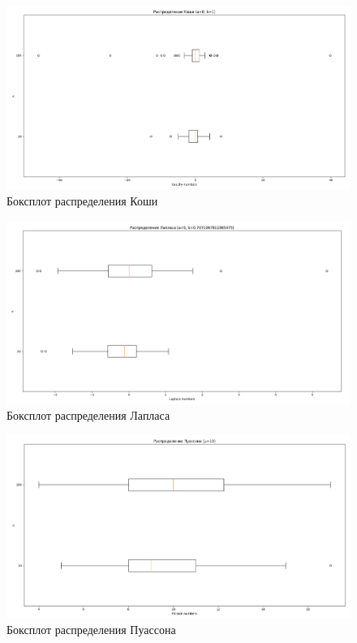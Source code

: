 \begin{figure}[H]
	\centering
	\includegraphics[scale=0.3]{resources/3_cauchy.png}
	\caption{Боксплот распределения Коши}
\end{figure}

\begin{figure}[H]
	\centering
	\includegraphics[scale=0.3]{resources/3_laplace.png}
	\caption{Боксплот распределения Лапласа}
\end{figure}

\begin{figure}[H]
	\centering
	\includegraphics[scale=0.3]{resources/3_poisson.png}
	\caption{Боксплот распределения Пуассона}
\end{figure}

